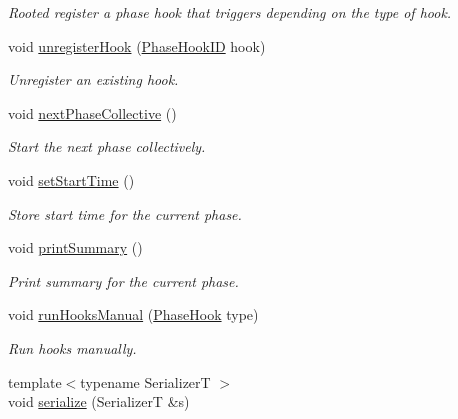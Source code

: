 \begin{DoxyCompactItemize}
\begin{DoxyCompactList}\small\item\em Rooted register a phase hook that triggers depending on the type of hook. \end{DoxyCompactList}\item 
void \hyperlink{structvt_1_1phase_1_1_phase_manager_a78334fd49c35f694f1e5fe5c560dc211}{unregister\+Hook} (\hyperlink{structvt_1_1phase_1_1_phase_hook_i_d}{Phase\+Hook\+ID} hook)
\begin{DoxyCompactList}\small\item\em Unregister an existing hook. \end{DoxyCompactList}\item 
void \hyperlink{structvt_1_1phase_1_1_phase_manager_ac94bfde4a103cbdec426542191c41092}{next\+Phase\+Collective} ()
\begin{DoxyCompactList}\small\item\em Start the next phase collectively. \end{DoxyCompactList}\item 
void \hyperlink{structvt_1_1phase_1_1_phase_manager_a7844c9468a45c9e49d94436f3f565a1f}{set\+Start\+Time} ()
\begin{DoxyCompactList}\small\item\em Store start time for the current phase. \end{DoxyCompactList}\item 
void \hyperlink{structvt_1_1phase_1_1_phase_manager_a43135040234c7d54396a70a3b27d79cd}{print\+Summary} ()
\begin{DoxyCompactList}\small\item\em Print summary for the current phase. \end{DoxyCompactList}\item 
void \hyperlink{structvt_1_1phase_1_1_phase_manager_ae436f95e5eb570b17c71a48d96675f69}{run\+Hooks\+Manual} (\hyperlink{namespacevt_1_1phase_aec9a63fdd99680d7a7fe99d321193811}{Phase\+Hook} type)
\begin{DoxyCompactList}\small\item\em Run hooks manually. \end{DoxyCompactList}\item 
{\footnotesize template$<$typename SerializerT $>$ }\\void \hyperlink{structvt_1_1phase_1_1_phase_manager_a9cc247a2194bc858fa043a5fe5c9fb76}{serialize} (SerializerT \&s)
\end{DoxyCompactItemize}
